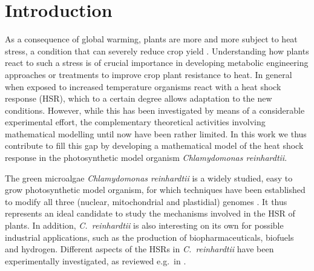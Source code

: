\documentclass[oneside, 10pt, a4paper, twocolumn]{article}
\begin{document}
\section{Introduction}

As a consequence of global warming, plants are more and more subject to heat stress, a condition that can severely reduce crop yield \cite{Lobell2011,Deryng2014}. 
Understanding how plants react to such a stress is of crucial importance in developing metabolic engineering approaches or treatments to improve crop plant resistance to heat. 
In general when exposed to increased temperature organisms react
with a heat shock response (HSR), which to a certain degree allows adaptation to the new conditions. 
However, while this has been investigated by means of a considerable experimental effort, the complementary theoretical activities involving mathematical modelling until now have been rather limited. In this work we thus contribute to fill this gap by developing a mathematical model of the heat shock response in the photosynthetic model organism \emph{Chlamydomonas reinhardtii}.

The green microalgae \emph{Chlamydomonas reinhardtii} %
is a widely studied, easy to grow photosynthetic model organism, for which techniques have been established to modify
all three (nuclear, mitochondrial and plastidial) genomes \mbox{\cite{Rochaix1995,Duby1999}.} 
It thus represents an %
ideal candidate to study the mechanisms involved in the HSR of plants. 
In addition, \emph{C.~reinhardtii} is also interesting on its own for possible industrial applications, such as the production of biopharmaceuticals, biofuels and hydrogen. 
Different aspects of the HSRs in \emph{C.~reinhardtii} have been experimentally investigated, as reviewed e.g.~in \cite{Schroda2015}. 
\end{document}
